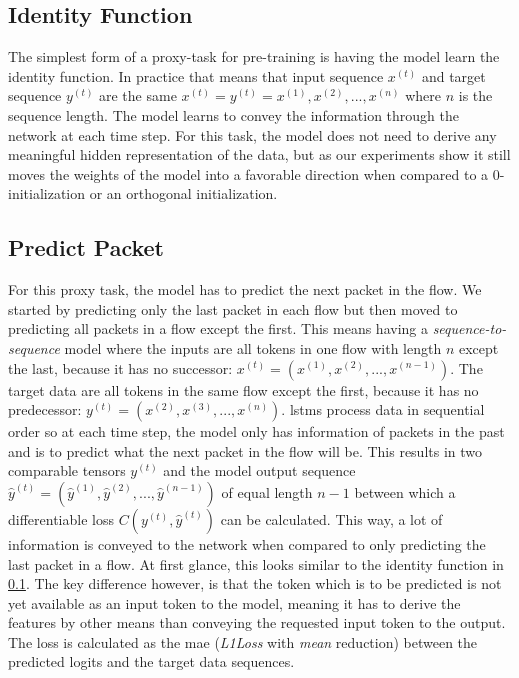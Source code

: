 \subsection{Identity Function} \label{sec:experiments_lstm_identity}

The simplest form of a proxy-task for pre-training is having the model learn the identity function.
In practice that means that input sequence $x^{(t)}$ and target sequence $y^{(t)}$ are the same $x^{(t)} = y^{(t)} = x^{(1)}, x^{(2)}, ... , x^{(n)}$ where $n$ is the sequence length. The model learns to convey the information through the network at each time step. For this task, the model does not need to derive any meaningful hidden representation of the data, but as our experiments show it still moves the weights of the model into a favorable direction when compared to a 0-initialization or an orthogonal initialization. 

\subsection{Predict Packet} \label{sec:experiments_lstm_predict_packet}

For this proxy task, the model has to predict the next packet in the flow. We started by predicting only the last packet in each flow but then moved to predicting all packets in a flow except the first. This means having a \textit{sequence-to-sequence} model where the inputs are all tokens in one flow with length $n$ except the last, because it has no successor: $x^{(t)} = (x^{(1)}, x^{(2)}, ..., x^{(n-1)})$. The target data are all tokens in the same flow except the first, because it has no predecessor: $y^{(t)} = (x^{(2)}, x^{(3)}, ..., x^{(n)})$. \glspl{lstm} process data in sequential order so at each time step, the model only has information of packets in the past and is to predict what the next packet in the flow will be. This results in two comparable tensors $y^{(t)}$ and the model output sequence $\hat{y}^{(t)} = (\hat{y}^{(1)}, \hat{y}^{(2)}, ..., \hat{y}^{(n-1)})$ of equal length $n-1$ between which a differentiable loss $C(y^{(t)},\hat{y}^{(t)})$ can be calculated. This way, a lot of information is conveyed to the network when compared to only predicting the last packet in a flow. At first glance, this looks similar to the identity function in \ref{sec:experiments_lstm_identity}. The key difference however, is that the token which is to be predicted is not yet available as an input token to the model, meaning it has to derive the features by other means than conveying the requested input token to the output. The loss is calculated as the \gls{mae} (\textit{L1Loss} with \textit{mean} reduction) between the predicted logits and the target data sequences.

